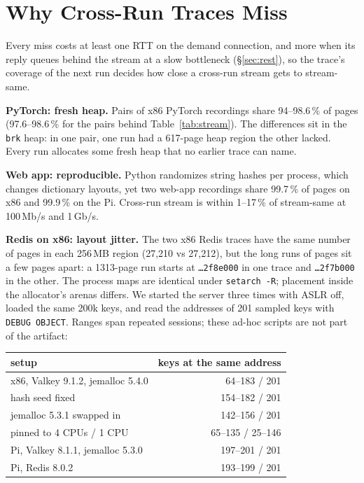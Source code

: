 \documentclass[conference]{IEEEtran}
\newcommand{\mode}[1]{\textsf{#1}}
\begin{document}
\section{Why Cross-Run Traces Miss}
\label{sec:misses}

Every miss costs at least one RTT on the demand connection, and more when
its reply queues behind the stream at a slow bottleneck
(\S\ref{sec:rest}), so the trace's coverage
of the next run decides how close a cross-run stream gets to
\mode{stream-same}.

\textbf{PyTorch: fresh heap.} Pairs of x86 PyTorch recordings share
94--98.6\,\% of pages (97.6--98.6\,\% for the pairs behind
Table~\ref{tab:stream}). The differences sit in the \texttt{brk} heap: in
one pair, one run had a 617-page heap region the other lacked. Every run
allocates some fresh heap that no earlier trace can name.

\textbf{Web app: reproducible.} Python randomizes string hashes per
process, which changes dictionary layouts, yet two web-app recordings share
99.7\,\% of pages on x86 and 99.9\,\% on the Pi. Cross-run \mode{stream} is
within 1--17\,\% of \mode{stream-same} at 100\,Mb/s and 1\,Gb/s.

\textbf{Redis on x86: layout jitter.} The two x86 Redis traces have the
same number of pages in each 256\,MB region (27,210 vs 27,212), but the long
runs of pages sit a few pages apart: a 1313-page run starts at
\texttt{\ldots2f8e000} in one trace and \texttt{\ldots2f7b000} in the other.
The process maps are identical under \texttt{setarch -R}; placement inside
the allocator's arenas differs. We started the server three times with
ASLR off, loaded the same 200k keys, and read the addresses of 201 sampled
keys with \texttt{DEBUG OBJECT}. Ranges span repeated sessions; these
ad-hoc scripts are not part of the artifact:

\begin{center}
\small
\begin{tabular}{@{}lr@{}}
\toprule
setup & keys at the same address \\
\midrule
x86, Valkey 9.1.2, jemalloc 5.4.0 & 64--183 / 201 \\
\quad hash seed fixed & 154--182 / 201 \\
\quad jemalloc 5.3.1 swapped in & 142--156 / 201 \\
\quad pinned to 4 CPUs / 1 CPU & 65--135 / 25--146 \\
Pi, Valkey 8.1.1, jemalloc 5.3.0 & 197--201 / 201 \\
Pi, Redis 8.0.2 & 193--199 / 201 \\
\bottomrule
\end{tabular}
\end{center}
\end{document}
